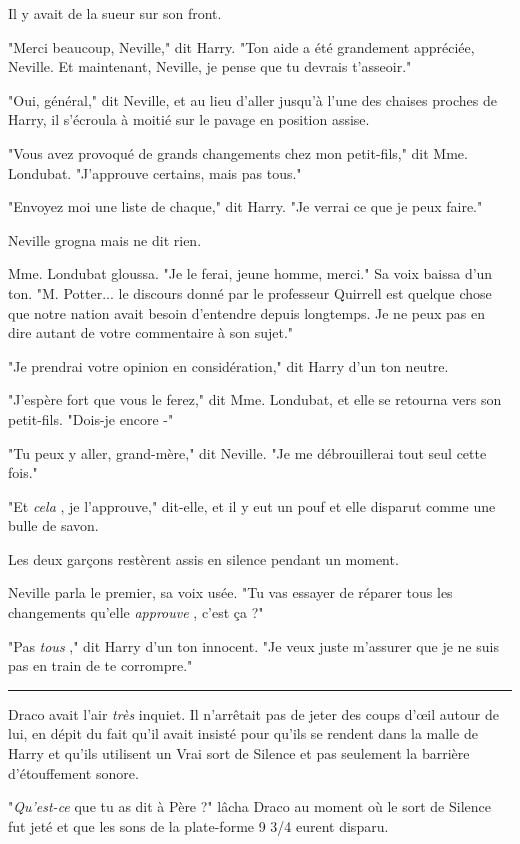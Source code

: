 Il y avait de la sueur sur son front.

"Merci beaucoup, Neville," dit Harry. "Ton aide a été grandement appréciée, Neville. Et maintenant, Neville, je pense que tu devrais t'asseoir."

"Oui, général," dit Neville, et au lieu d'aller jusqu'à l'une des chaises proches de Harry, il s'écroula à moitié sur le pavage en position assise.

"Vous avez provoqué de grands changements chez mon petit-fils," dit Mme. Londubat. "J'approuve certains, mais pas tous."

"Envoyez moi une liste de chaque," dit Harry. "Je verrai ce que je peux faire."

Neville grogna mais ne dit rien.

Mme. Londubat gloussa. "Je le ferai, jeune homme, merci." Sa voix baissa d'un ton. "M. Potter... le discours donné par le professeur Quirrell est quelque chose que notre nation avait besoin d'entendre depuis longtemps. Je ne peux pas en dire autant de votre commentaire à son sujet."

"Je prendrai votre opinion en considération," dit Harry d'un ton neutre.

"J'espère fort que vous le ferez," dit Mme. Londubat, et elle se retourna vers son petit-fils. "Dois-je encore -"

"Tu peux y aller, grand-mère," dit Neville. "Je me débrouillerai tout seul cette fois."

"Et \emph{cela} , je l'approuve," dit-elle, et il y eut un pouf et elle disparut comme une bulle de savon.

Les deux garçons restèrent assis en silence pendant un moment.

Neville parla le premier, sa voix usée. "Tu vas essayer de réparer tous les changements qu'elle \emph{approuve} , c'est ça ?"

"Pas \emph{tous} ," dit Harry d'un ton innocent. "Je veux juste m'assurer que je ne suis pas en train de te corrompre."
\par\noindent\rule{\textwidth}{0.4pt}
Draco avait l'air \emph{très}  inquiet. Il n'arrêtait pas de jeter des coups d'œil autour de lui, en dépit du fait qu'il avait insisté pour qu'ils se rendent dans la malle de Harry et qu'ils utilisent un Vrai sort de Silence et pas seulement la barrière d'étouffement sonore.

"\emph{Qu'est-ce}  que tu as dit à Père ?" lâcha Draco au moment où le sort de Silence fut jeté et que les sons de la plate-forme 9 3/4 eurent disparu.

